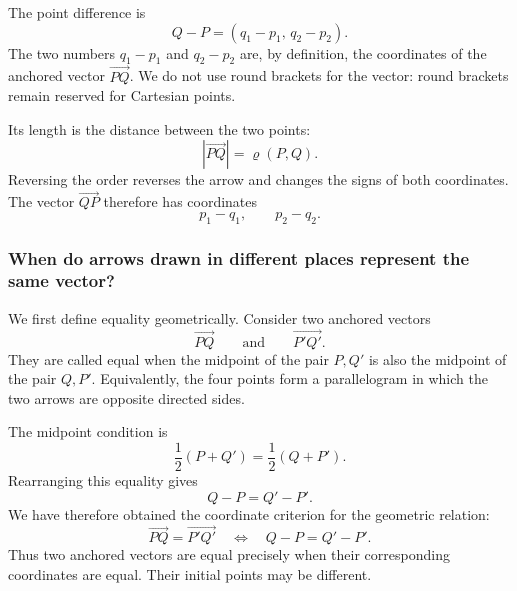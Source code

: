 The point difference is
\[
Q-P=(q_1-p_1,\,q_2-p_2).
\]
The two numbers $q_1-p_1$ and $q_2-p_2$ are, by definition, the coordinates of
the anchored vector $\overrightarrow{PQ}$. We do not use round brackets for the
vector: round brackets remain reserved for Cartesian points.

Its length is the distance between the two points:
\[
\boxed{
|\overrightarrow{PQ}|=\varrho(P,Q)
}.
\]
Reversing the order reverses the arrow and changes the signs of both coordinates.
The vector $\overrightarrow{QP}$ therefore has coordinates
\[
p_1-q_1,
\qquad
p_2-q_2.
\]

\subsubsection*{When do arrows drawn in different places represent the same vector?}

We first define equality geometrically. Consider two anchored vectors
\[
\overrightarrow{PQ}
\qquad\text{and}\qquad
\overrightarrow{P'Q'}.
\]
They are called equal when the midpoint of the pair $P,Q'$ is also the midpoint
of the pair $Q,P'$. Equivalently, the four points form a parallelogram in which
the two arrows are opposite directed sides.

\begin{center}
\end{center}

The midpoint condition is
\[
\frac12(P+Q')=\frac12(Q+P').
\]
Rearranging this equality gives
\[
Q-P=Q'-P'.
\]
We have therefore obtained the coordinate criterion for the geometric relation:
\[
\boxed{
\overrightarrow{PQ}=\overrightarrow{P'Q'}
\quad\Longleftrightarrow\quad
Q-P=Q'-P'
}.
\]
Thus two anchored vectors are equal precisely when their corresponding
coordinates are equal. Their initial points may be different.

